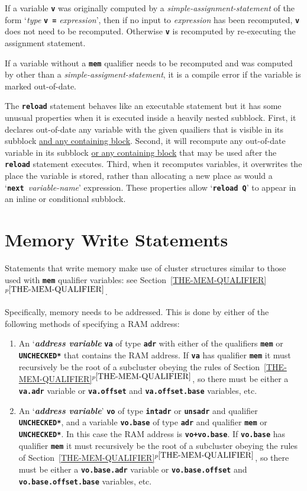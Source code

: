 \documentclass[12pt]{article}
\newcommand{\TT}[1]{{\tt \bfseries #1}}
\newcommand{\key}[1]{{\bf \em #1}\index{#1}}
\newcommand{\itemref}[1]{\ref{#1}$^{p\pageref{#1}}$}
\newcommand{\EOL}{\penalty \exhyphenpenalty}
\begin{document}
If a variable \TT{v} was originally computed by
a {\em simple-assignment-statement}
of the form `{\em type} \TT{v =} {\em expression}', then if
no input to {\em expression} has been recomputed, \TT{v} does not
need to be recomputed.  Otherwise \TT{v} is recomputed by re-executing
the assignment statement.

If a variable without a \TT{mem} qualifier needs to be
recomputed and was computed by other than
a {\em simple-assigment-statement}, it is a compile error if the
variable is marked out-of-date.

The \TT{reload} statement behaves like an executable statement but
it has some unusual properties when it is executed inside a heavily
nested subblock.  First, it declares out-of-date any variable with
the given quailiers that is visible in its subblock \underline{and any
containing block}.
Second, it will recompute any out-of-date variable in its subblock
\underline{or any containing block} that may be used after the
\TT{reload} statement executes.
Third, when it recomputes variables, it overwrites
the place the variable is stored, rather than allocating a new
place as would a `\TT{next~}{\em variable-name}' expression.
These properties allow `\TT{reload Q}' to appear in an inline
or conditional subblock.

\section{Memory Write Statements}
\label{MEMORY-WRITE-STATEMENTS}

Statements that write memory make use of cluster structures
similar to those used with
\TT{mem} qualifier variables:
see Section~\itemref{THE-MEM-QUALIFIER}.

Specifically, memory needs to be addressed.  This is done by either
of the following methods of specifying a RAM address:
\begin{enumerate}
\item
An `\key{address variable} \TT{va}
of type \TT{adr} with either of the qualifiers
\TT{mem} or \TT{*UNCHECKED*} that contains the RAM address.
If \TT{va} has qualifier \TT{mem} it must recursively be
the root of a subcluster obeying
the rules of Section~\itemref{THE-MEM-QUALIFIER},
so there must be either a \TT{va.adr} variable
or \TT{va.offset} and \TT{va.offset\EOL .base}
variables, etc.


\item
An `\key{address variable}' \TT{vo} of type \TT{intadr} or \TT{unsadr} and
qualifier \TT{*UNCHECKED*}, and
a variable \TT{vo.base} of type \TT{adr} and qualifier \TT{mem}
or \TT{*UNCHECKED*}.
In this case the RAM address is \TT{vo+vo.base}.
If \TT{vo.base} has qualifier \TT{mem} it must recursively be
the root of a subcluster obeying
the rules of Section~\itemref{THE-MEM-QUALIFIER},
so there must be either a \TT{vo.base.adr} variable
or \TT{vo.base.offset} and \TT{vo.base.offset\EOL .base}
variables, etc.

\end{enumerate}
\end{document}

